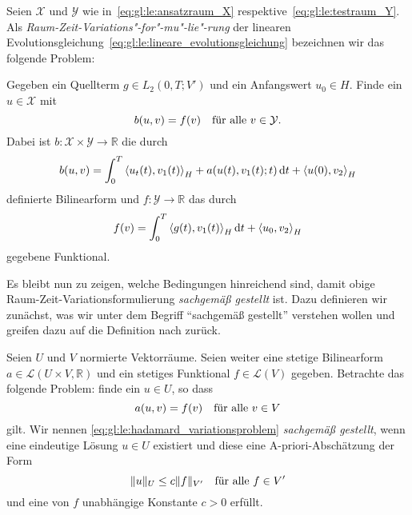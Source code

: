 \begin{Definition}
\label{def:gl:le:schwache_raum_zeit_formulierung}
    Seien $\mathcal X$ und $\mathcal Y$ wie in~\cref{eq:gl:le:ansatzraum_X} respektive~\cref{eq:gl:le:testraum_Y}.
    Als \emph{Raum-Zeit-Variations"-for"-mu"-lie"-rung} der linearen Evolutionsgleichung~\cref{eq:gl:le:lineare_evolutionsgleichung} bezeichnen wir das folgende Problem:

    Gegeben ein Quellterm $g \in L_{2}(0, T; V')$ und ein Anfangswert $u_{0} \in H$.
    Finde ein $u \in \mathcal X$ mit
    \begin{equation}
        \label{eq:gl:le:schwache_formulierung}
        b(u, v) = f(v) \quad \fa v \in \mathcal Y.
    \end{equation}
    Dabei ist $b \colon \mathcal X \times \mathcal Y \to \mathbb{R}$ die durch
    \begin{equation}
        \label{eq:gl:le:schwache_formulierung_lhs_b}
        b(u, v) = \int_{0}^{T} \skprod{u_{t}(t)}{v_{1}(t)}_{H} + a(u(t), v_{1}(t); t) \diff t + \skprod{u(0)}{v_{2}}_{H}
    \end{equation}
    definierte Bilinearform und $f \colon \mathcal Y \to \mathbb{R}$ das durch
    \begin{equation}
        \label{eq:gl:le:schwache_formulierung_rhs_f}
        f(v) = \int_{0}^{T} \skprod{g(t)}{v_{1}(t)}_{H} \diff t + \skprod{u_{0}}{v_{2}}_{H}
    \end{equation}
    gegebene Funktional.
\end{Definition}

Es bleibt nun zu zeigen, welche Bedingungen hinreichend sind, damit obige Raum-Zeit-Variationsformulierung \emph{sachgemäß gestellt} ist.
Dazu definieren wir zunächst, was wir unter dem Begriff \enquote{sachgemäß gestellt} verstehen wollen und greifen dazu auf die Definition nach \textcite{hadamard1902problemes} zurück.

\begin{Definition}
\label{def:gl:le:hadamard_sachgemaess_gestellt}
    Seien $U$ und $V$ normierte Vektorräume.
    Seien weiter eine stetige Bilinearform $a \in \mathcal L(U \times V, \mathbb{R})$ und ein stetiges Funktional $f \in \mathcal L(V)$ gegeben.
    Betrachte das folgende Problem: finde ein $u \in U$, so dass
    \begin{equation}
    \label{eq:gl:le:hadamard_variationsproblem}
        a(u, v) = f(v) \quad \fa v \in V
    \end{equation}
    gilt.
    Wir nennen \cref{eq:gl:le:hadamard_variationsproblem} \emph{sachgemäß gestellt}, wenn eine eindeutige Lösung $u \in U$ existiert und diese eine A-priori-Abschätzung der Form
    \begin{equation}
    \label{eq:gl:le:hadamard_abschaetzung}
        \norm{u}_{U} \leq c \norm{f}_{V'} \quad \fa f \in V'
    \end{equation}
    und eine von $f$ unabhängige Konstante $c > 0$ erfüllt.
\end{Definition}

